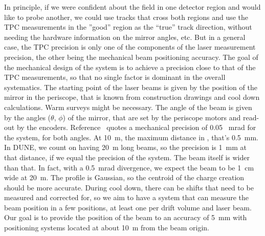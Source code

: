 In principle, if we were confident about the field in one detector region and would like to probe another, we could use tracks that cross both regions and use the TPC measurements in the ''good'' region as the ``true'' track direction, without needing the hardware information on the mirror angles, etc. But in a general case, the TPC precision is only one of the components of the laser measurement precision, the other being the mechanical beam positioning accuracy. The goal of the mechanical design of the system is to achieve a precision close to that of the TPC measurements, so that no single factor is dominant in the overall systematics. The starting point of the laser beams is given by the position of the mirror in the periscope, that is known from construction drawings and cool down calculations. Warm surveys might be necessary. The angle of the beam is given by the angles ($\theta$, $\phi$) of the mirror, that are set by the periscope motors and read-out by the encoders. 
Reference~\cite{chen2018} quotes a mechanical precision of 0.05 ~mrad for the  system, for both angles. At 10~m, the maximum distance in , that's 0.5~mm. In DUNE, we count on having 20~m long beams, so the precision is 1~mm at that distance, if we equal the precision of the  system. The beam itself is wider than that. In fact, with a 0.5~mrad divergence, we expect the beam to be 1~cm wide at 20~m. The profile is Gaussian, so the centroid of the charge creation should be more accurate. During cool down, there can be shifts that need to be measured and corrected for, so we aim to have a system that can measure the beam position in a few positions, at least one per drift volume and laser beam. Our goal is to provide the position of the beam to an accuracy of 5~mm with positioning systems located at about 10~m from the beam origin.



 
 


